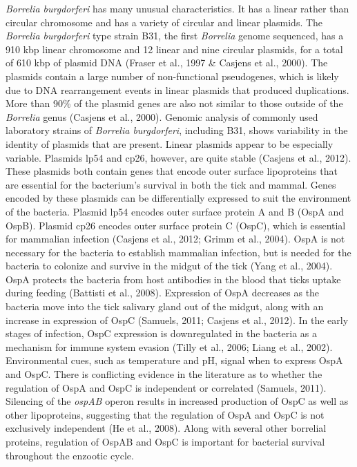 \documentclass[12pt,twoside]{reedthesis}
\begin{document}
	
	 \textit{Borrelia burgdorferi} has many unusual characteristics. It has a linear rather than circular chromosome and has a variety of circular and linear plasmids. The \textit{Borrelia burgdorferi} type strain B31, the first \textit{Borrelia} genome sequenced, has a 910 kbp linear chromosome and 12 linear and nine circular plasmids, for a total of 610 kbp of plasmid DNA (Fraser et al., 1997 \& Casjens et al., 2000). The plasmids contain a large number of non-functional pseudogenes, which is likely due to DNA rearrangement events in linear plasmids that produced duplications. More than 90\% of the plasmid genes are also not similar to those outside of the \textit{Borrelia} genus (Casjens et al., 2000). Genomic analysis of commonly used laboratory strains of \textit{Borrelia  burgdorferi}, including B31, shows variability in the identity of plasmids that are present. Linear plasmids appear to be especially variable. Plasmids lp54 and cp26, however, are quite stable (Casjens et al., 2012). These plasmids both contain genes that encode outer surface lipoproteins that are essential for the bacterium's survival in both the tick and mammal. Genes encoded by these plasmids can be differentially expressed to suit the environment of the bacteria. Plasmid lp54 encodes outer surface protein A and B (OspA and OspB). Plasmid cp26 encodes outer surface protein C (OspC), which is essential for mammalian infection (Casjens et al., 2012; Grimm et al., 2004). OspA is not necessary for the bacteria to establish mammalian infection, but is needed for the bacteria to colonize and survive in the midgut of the tick (Yang et al., 2004). OspA protects the bacteria from host antibodies in the blood that ticks uptake during feeding (Battisti et al., 2008). Expression of OspA decreases as the bacteria move into the tick salivary gland out of the midgut, along with an increase in expression of OspC (Samuels, 2011; Casjens et al., 2012). In the early stages of infection, OspC expression is downregulated in the bacteria as a mechanism for immune system evasion (Tilly et al., 2006; Liang et al., 2002). Environmental cues, such as temperature and pH, signal when to express OspA and OspC. There is conflicting evidence in the literature as to whether the regulation of OspA and OspC is independent or correlated (Samuels, 2011). Silencing of the \textit{ospAB} operon results in increased production of OspC as well as other lipoproteins, suggesting that the regulation of OspA and OspC is not exclusively independent (He et al., 2008). Along with several other borrelial proteins,  regulation of OspAB and OspC is important for bacterial survival throughout the enzootic cycle. 
	 
\end{document}

